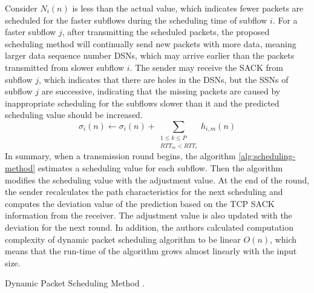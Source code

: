 \documentclass[sigplan,screen,nonacm]{acmart}
\begin{document}
Consider $N_{i}(n)$ is less than the actual value, which indicates fewer packets are scheduled for the faster subflows during the scheduling time of subflow $i$. For a faster subflow $j$, after transmitting the scheduled packets, the proposed scheduling method will continually send new packets with more data, meaning larger data sequence number DSNs, which may arrive earlier than the packets transmitted from slower subflow $i$. The sender may receive the SACK from subflow $j$, which indicates that there are holes in the DSNs, but the SSNs of subflow $j$ are successive, indicating that the missing packets are caused by inappropriate scheduling for the subflows slower than it and the predicted scheduling value should be increased.
\begin{equation} 
\sigma_{i}(n)\leftarrow\sigma_{i}(n)+ \sum_{\substack{1\leq k\leq P \\ RTT_{m} < RTT_{i}}}h_{i,m}(n) 
\label{eq:case-two} \tag{12} 
\end{equation}
In summary, when a transmission round begins, the algorithm \ref{alg:scheduling-method} estimates a scheduling value for each subflow. Then the algorithm modifies the scheduling value with the adjustment value. At the end of the round, the sender recalculates the path characteristics for the next scheduling and computes the deviation value of the prediction based on the TCP SACK information from the receiver. The adjustment value is also updated with the deviation for the next round. In addition, the authors calculated computation complexity of dynamic packet scheduling algorithm to be linear $O(n)$, which means that the run-time of the algorithm grows almost linearly with the input size.
\begin{algorithm}[H]
\caption{Dynamic Packet Scheduling Method \cite{NewMethod:2018}.}
\begin{algorithmic}[1]
    \EndIf
    \EndIf

\end{algorithmic}
\label{alg:scheduling-method}
\end{algorithm}
\end{document}
